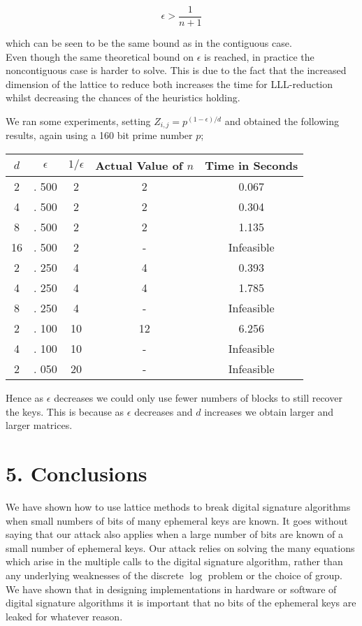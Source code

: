 \documentclass[10pt]{article}
\begin{document}
$$
\epsilon>\frac{1}{n+1}
$$

which can be seen to be the same bound as in the contiguous case.\\
Even though the same theoretical bound on $\epsilon$ is reached, in practice the noncontiguous case is harder to solve. This is due to the fact that the increased dimension of the lattice to reduce both increases the time for LLL-reduction whilst decreasing the chances of the heuristics holding.

We ran some experiments, setting $Z_{i, j}=p^{(1-\epsilon) / d}$ and obtained the following results, again using a 160 bit prime number $p$;

\begin{center}
\begin{tabular}{|c|c|c|c|c|}
\hline
$d$ & $\epsilon$ & $1 / \epsilon$ & Actual Value of $n$ & Time in Seconds \\
\hline
2 & . 500 & 2 & 2 & 0.067 \\
\hline
4 & . 500 & 2 & 2 & 0.304 \\
\hline
8 & . 500 & 2 & 2 & 1.135 \\
\hline
16 & . 500 & 2 & - & Infeasible \\
\hline
2 & . 250 & 4 & 4 & 0.393 \\
\hline
4 & . 250 & 4 & 4 & 1.785 \\
\hline
8 & . 250 & 4 & - & Infeasible \\
\hline
2 & . 100 & 10 & 12 & 6.256 \\
\hline
4 & . 100 & 10 & - & Infeasible \\
\hline
2 & . 050 & 20 & - & Infeasible \\
\hline
\end{tabular}
\end{center}

Hence as $\epsilon$ decreases we could only use fewer numbers of blocks to still recover the keys. This is because as $\epsilon$ decreases and $d$ increases we obtain larger and larger matrices.

\section*{5. Conclusions}
We have shown how to use lattice methods to break digital signature algorithms when small numbers of bits of many ephemeral keys are known. It goes without saying that our attack also applies when a large number of bits are known of a small number of ephemeral keys. Our attack relies on solving the many equations which arise in the multiple calls to the digital signature algorithm, rather than any underlying weaknesses of the discrete $\log$ problem or the choice of group. We have shown that in designing implementations in hardware or software of digital signature algorithms it is important that no bits of the ephemeral keys are leaked for whatever reason.
\end{document}
